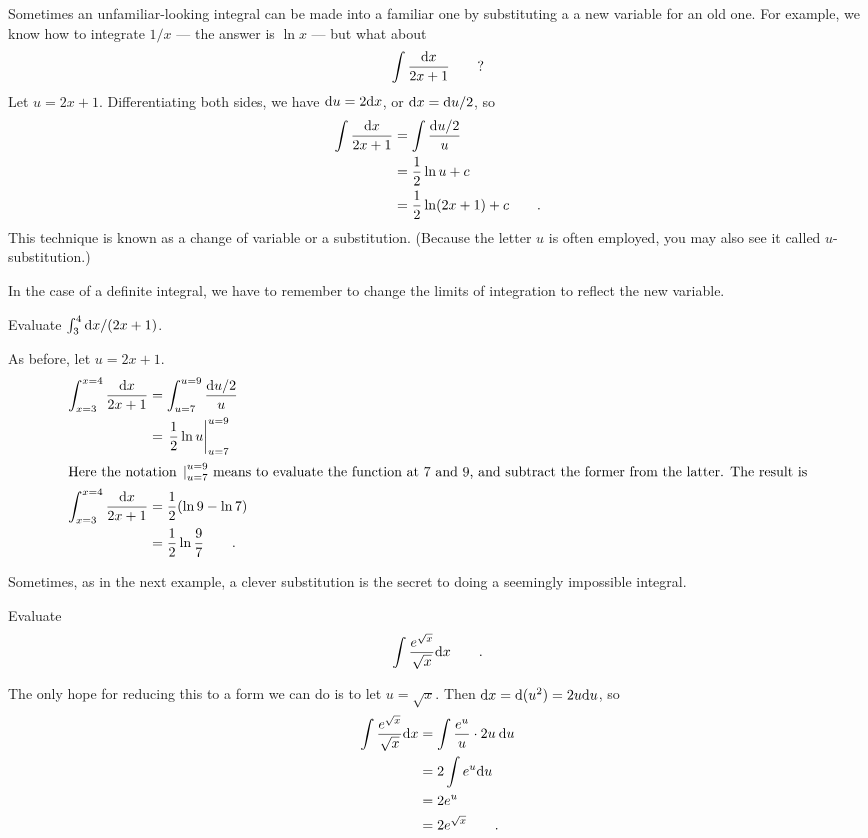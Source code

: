 Sometimes an unfamiliar-looking integral can be made into a familiar one by substituting a
a new variable for an old one. For example, we know how to integrate $1/x$ --- the answer
is $\ln x$ --- but what about
\begin{equation*}
  \int \frac{\textup{d} x}{2x+1}   \qquad ?
\end{equation*}
Let $u=2x+1$. Differentiating both sides, we have $\textup{d} u=2\textup{d} x$, or $\textup{d} x=\textup{d} u/2$, so
\begin{align*}
  \int \frac{\textup{d} x}{2x+1}   &= \int \frac{\textup{d} u/2}{u} \\
       &= \frac{1}{2}\ln u + c \\
       &= \frac{1}{2}\ln(2x+1) +c \qquad .
\end{align*}
This technique is known as a change of variable or a substitution. (Because the letter $u$ is often
employed, you may also see it called $u$-substitution.)

In the case of a definite integral, we have to remember to change the limits of integration
to reflect the new variable.

\begin{eg}
\egquestion Evaluate $\int_3^4 \textup{d} x/(2x+1)$.

\eganswer As before, let $u=2x+1$.
\begin{align*}
  \int_{x=3}^{x=4} \frac{\textup{d} x}{2x+1}   &= \int_{u=7}^{u=9} \frac{\textup{d} u/2}{u} \\
       &= \left.\frac{1}{2}\ln u\right|_{u=7}^{u=9} \\
\intertext{Here the notation $\left.\right|_{u=7}^{u=9}$ means to evaluate the function at
7 and 9, and subtract the former from the latter. The result is}
  \int_{x=3}^{x=4} \frac{\textup{d} x}{2x+1}  &= \frac{1}{2}(\ln 9-\ln 7) \\
            &=\frac{1}{2}\ln\frac{9}{7} \qquad .
\end{align*}
\end{eg}

Sometimes, as in the next example, a clever substitution is the secret to doing a
seemingly impossible integral.

\begin{eg}\label{eg:not-so-tricky}
\egquestion Evaluate
\begin{equation*}
  \int \frac{e^{\sqrt x}}{\sqrt x} \textup{d} x \qquad .
\end{equation*}

\eganswer The only hope for reducing this to a form we can do is to let
$u=\sqrt x$. Then $\textup{d} x=\textup{d}(u^2)=2u\textup{d} u$, so
\begin{align*}
  \int \frac{e^{\sqrt x}}{\sqrt x} \textup{d} x &=   \int \frac{e^u}{u} \cdot 2u\:\textup{d} u \\
             &= 2 \int e^u \textup{d} u \\
             &= 2e^u \\
             &= 2e^{\sqrt{x}} \qquad .
\end{align*}
\end{eg}

